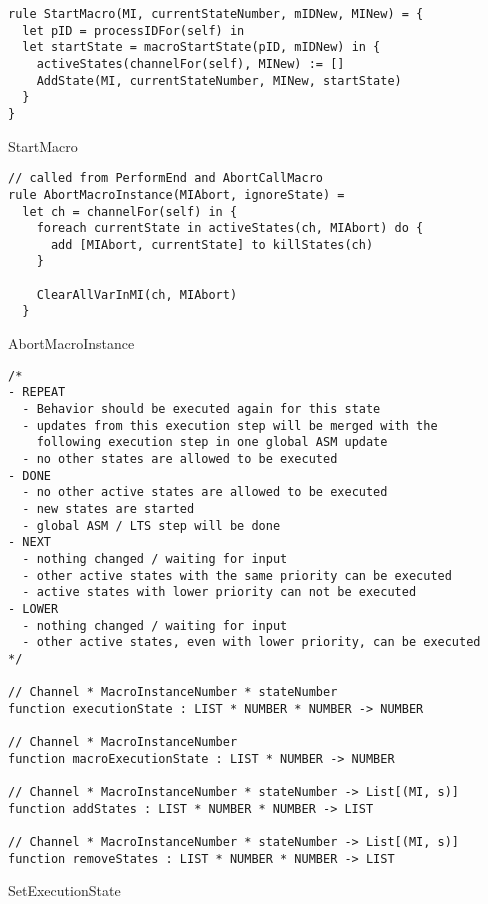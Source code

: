 \begin{listing}[H]
\begin{verbatim}
rule StartMacro(MI, currentStateNumber, mIDNew, MINew) = {
  let pID = processIDFor(self) in
  let startState = macroStartState(pID, mIDNew) in {
    activeStates(channelFor(self), MINew) := []
    AddState(MI, currentStateNumber, MINew, startState)
  }
}
\end{verbatim}
\caption{StartMacro}
\label{lst:asm:StartMacro}
\end{listing}


\begin{listing}[H]
\begin{verbatim}
// called from PerformEnd and AbortCallMacro
rule AbortMacroInstance(MIAbort, ignoreState) =
  let ch = channelFor(self) in {
    foreach currentState in activeStates(ch, MIAbort) do {
      add [MIAbort, currentState] to killStates(ch)
    }

    ClearAllVarInMI(ch, MIAbort)
  }
\end{verbatim}
\caption{AbortMacroInstance}
\label{lst:asm:AbortMacroInstance}
\end{listing}



\begin{listing}[H]
\begin{verbatim}
/*
- REPEAT
  - Behavior should be executed again for this state
  - updates from this execution step will be merged with the
    following execution step in one global ASM update
  - no other states are allowed to be executed
- DONE
  - no other active states are allowed to be executed
  - new states are started
  - global ASM / LTS step will be done
- NEXT
  - nothing changed / waiting for input
  - other active states with the same priority can be executed
  - active states with lower priority can not be executed
- LOWER
  - nothing changed / waiting for input
  - other active states, even with lower priority, can be executed
*/

// Channel * MacroInstanceNumber * stateNumber
function executionState : LIST * NUMBER * NUMBER -> NUMBER

// Channel * MacroInstanceNumber
function macroExecutionState : LIST * NUMBER -> NUMBER

// Channel * MacroInstanceNumber * stateNumber -> List[(MI, s)]
function addStates : LIST * NUMBER * NUMBER -> LIST

// Channel * MacroInstanceNumber * stateNumber -> List[(MI, s)]
function removeStates : LIST * NUMBER * NUMBER -> LIST
\end{verbatim}
\caption{SetExecutionState}
\label{lst:asm:SetExecutionState}
\end{listing}




